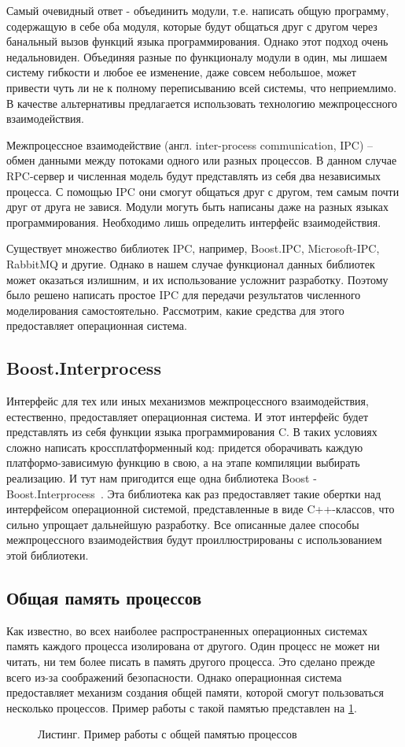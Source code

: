 \documentclass[a4paper,14pt,indentfirst]{extreport}
\newcommand{\EN}[1]{\foreignlanguage{english}{#1}}
\begin{document}
Самый очевидный ответ - объединить модули, т.е. написать общую программу, содержащую в себе оба модуля, которые будут общаться друг с другом через банальный вызов функций языка программирования. Однако этот подход очень недальновиден. Объединяя разные по функционалу модули в один, мы лишаем систему гибкости и любое ее изменение, даже совсем небольшое, может привести чуть ли не к полному переписыванию всей системы, что неприемлимо. В качестве альтернативы предлагается использовать технологию межпроцессного взаимодействия.

Межпроцессное взаимодействие (англ. \EN{inter-process communication, IPC}) -- обмен данными между потоками одного или разных процессов. В данном случае RPC-сервер и численная модель будут представлять из себя два независимых процесса. С помощью IPC они смогут общаться друг с другом, тем самым почти друг от друга не завися. Модули могуть быть написаны даже на разных языках программирования. Необходимо лишь определить интерфейс взаимодействия.

Существует множество библиотек IPC, например, \EN{Boost.IPC, Microsoft-IPC, RabbitMQ} и другие. Однако в нашем случае функционал данных библиотек может оказаться излишним, и их использование усложнит разработку. Поэтому было решено написать простое IPC для передачи результатов численного моделирования самостоятельно. Рассмотрим, какие средства для этого предоставляет операционная система.
\subsection{Boost.Interprocess}
Интерфейс для тех или иных механизмов межпроцессного взаимодействия, естественно, предоставляет операционная система. И этот интерфейс будет представлять из себя функции языка программирования C. В таких условиях сложно написать кроссплатформенный код: придется оборачивать каждую платформо-зависимую функцию в свою, а на этапе компиляции выбирать реализацию. И тут нам пригодится еще одна библиотека Boost - Boost.Interprocess~\cite{3boost}. Эта библиотека как раз предоставляет такие обертки над интерфейсом операционной системой, представленные в виде C++-классов, что сильно упрощает дальнейшую разработку. Все описанные далее способы межпроцессного взаимодействия будут проиллюстрированы с использованием этой библиотеки.
\subsection{Общая память процессов}
Как известно, во всех наиболее распространенных операционных системах память каждого процесса изолирована от другого. Один процесс не может ни читать, ни тем более писать в память другого процесса. Это сделано прежде всего из-за соображений безопасности. Однако операционная система предоставляет механизм создания общей памяти, которой смогут пользоваться несколько процессов. Пример работы с такой памятью представлен на \cref{shared_memory}.
\begin{figure}[H]
  
  \caption{Листинг. Пример работы с общей памятью процессов}
  \label{shared_memory}
\end{figure}
\end{document}
